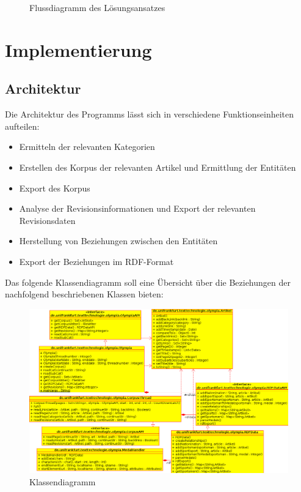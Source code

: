 \documentclass[pagesize=auto, titlepage=on]{scrartcl}
\begin{document}
\begin{figure}[tb]
  \caption{Flussdiagramm des Lösungsansatzes}
  \label{fig:flowchart}
\end{figure}

\clearpage

\section{Implementierung}
\label{sec:Implementierung}
\subsection{Architektur}
Die Architektur des Programms lässt sich in verschiedene Funktionseinheiten aufteilen:
\begin{itemize}
\item Ermitteln der relevanten Kategorien
\item Erstellen des Korpus der relevanten Artikel und Ermittlung der Entitäten
\item Export des Korpus
\item Analyse der Revisionsinformationen und Export der relevanten Revisionsdaten
\item Herstellung von Beziehungen zwischen den Entitäten
\item Export der Beziehungen im RDF-Format
\end{itemize}
Das folgende Klassendiagramm soll eine Übersicht über die Beziehungen der nachfolgend beschriebenen Klassen bieten:
\begin{figure}[htb]
  \centering
     \includegraphics*[width=1.0\textwidth]{images/classes.png}
   \caption[Klassendiagramm]{Klassendiagramm}
   \label{fig:nag_conf}
\end{figure}
\clearpage
\end{document}
